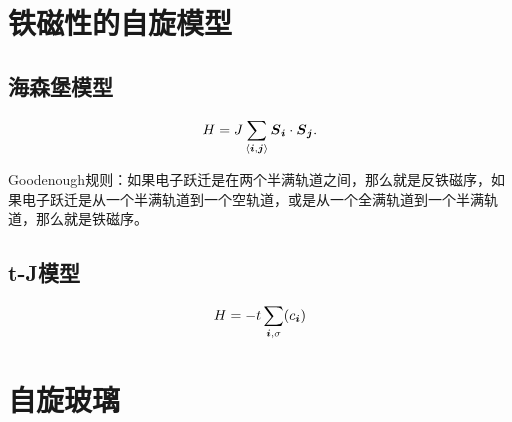 \chapter{铁磁性的自旋模型}\label{chap:magnetic}

\section{海森堡模型}

\begin{equation}
    H = J \sum_{\langle \vb*{i}, \vb*{j} \rangle} \vb*{S}_{\vb*{i}} \cdot \vb*{S}_{\vb*{j}}.
\end{equation}

Goodenough规则：如果电子跃迁是在两个半满轨道之间，那么就是反铁磁序，如果电子跃迁是从一个半满轨道到一个空轨道，或是从一个全满轨道到一个半满轨道，那么就是铁磁序。

\section{t-J模型}

\begin{equation}
    H = - t \sum_{\vb*{i}, \sigma} (c_{\vb*{i}})
\end{equation}

\chapter{自旋玻璃}